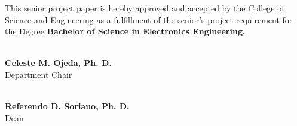 \begin{singlespace}
\vspace{0.35in}

This senior project paper is hereby approved and accepted by the College of
Science and Engineering as a fulfillment of the senior's project requirement
for the Degree \textbf{Bachelor of Science in Electronics Engineering.}

\vspace{0.42in}

\noindent
\begin{minipage}[t]{0.46\textwidth}
\centering
\makebox[2.65in]{\hrulefill}\\[-0.05in]
{\bfseries Celeste M. Ojeda, Ph. D.}\\
Department Chair
\end{minipage}
\hfill
\begin{minipage}[t]{0.46\textwidth}
\centering
\makebox[2.65in]{\hrulefill}\\[-0.05in]
{\bfseries Referendo D. Soriano, Ph. D.}\\
Dean
\end{minipage}
\end{singlespace}
